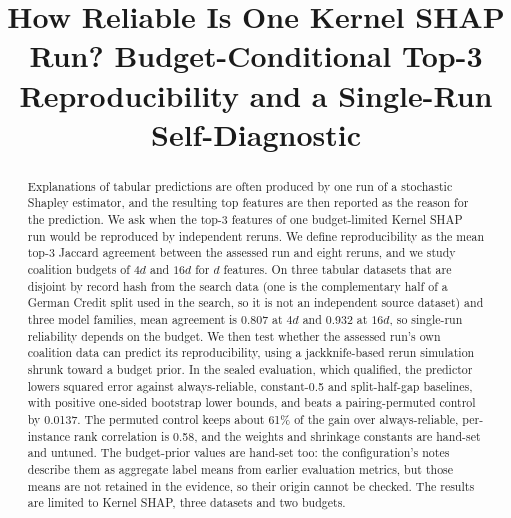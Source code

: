 \documentclass{article}
\title{How Reliable Is One Kernel SHAP Run? Budget-Conditional Top-3 Reproducibility and a Single-Run Self-Diagnostic}
\begin{document}
\maketitle

\begin{abstract}
Explanations of tabular predictions are often produced by one run of a stochastic Shapley estimator, and the resulting top features are then reported as the reason for the prediction. We ask when the top-3 features of one budget-limited Kernel SHAP run would be reproduced by independent reruns. We define reproducibility as the mean top-3 Jaccard agreement between the assessed run and eight reruns, and we study coalition budgets of $4d$ and $16d$ for $d$ features. On three tabular datasets that are disjoint by record hash from the search data (one is the complementary half of a German Credit split used in the search, so it is not an independent source dataset) and three model families, mean agreement is 0.807 at $4d$ and 0.932 at $16d$, so single-run reliability depends on the budget. We then test whether the assessed run's own coalition data can predict its reproducibility, using a jackknife-based rerun simulation shrunk toward a budget prior. In the sealed evaluation, which qualified, the predictor lowers squared error against always-reliable, constant-0.5 and split-half-gap baselines, with positive one-sided bootstrap lower bounds, and beats a pairing-permuted control by 0.0137. The permuted control keeps about 61\% of the gain over always-reliable, per-instance rank correlation is 0.58, and the weights and shrinkage constants are hand-set and untuned. The budget-prior values are hand-set too: the configuration's notes describe them as aggregate label means from earlier evaluation metrics, but those means are not retained in the evidence, so their origin cannot be checked. The results are limited to Kernel SHAP, three datasets and two budgets.
\end{abstract}
\end{document}
